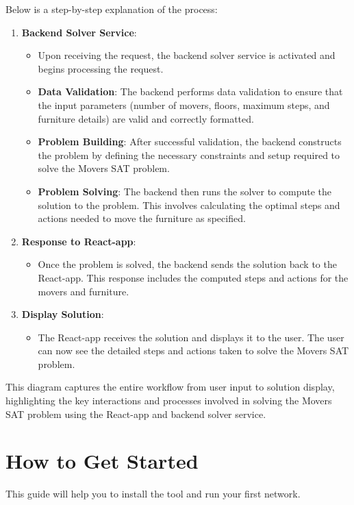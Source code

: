 \documentclass[a4paper, 11pt]{article}
\begin{document}
Below is a step-by-step explanation of the process:

\begin{enumerate}

	\item \textbf{Backend Solver Service}:
	      \begin{itemize}
		      \item Upon receiving the request, the backend solver service is activated and begins processing the request.
		      \item \textbf{Data Validation}: The backend performs data validation to ensure that the input parameters (number of movers, floors, maximum steps, and furniture details) are valid and correctly formatted.
		      \item \textbf{Problem Building}: After successful validation, the backend constructs the problem by defining the necessary constraints and setup required to solve the Movers SAT problem.
		      \item \textbf{Problem Solving}: The backend then runs the solver to compute the solution to the problem. This involves calculating the optimal steps and actions needed to move the furniture as specified.
	      \end{itemize}
	\item \textbf{Response to React-app}:
	      \begin{itemize}
		      \item Once the problem is solved, the backend sends the solution back to the React-app. This response includes the computed steps and actions for the movers and furniture.
	      \end{itemize}
	\item \textbf{Display Solution}:
	      \begin{itemize}
		      \item The React-app receives the solution and displays it to the user. The user can now see the detailed steps and actions taken to solve the Movers SAT problem.
	      \end{itemize}
\end{enumerate}

This diagram captures the entire workflow from user input to solution display, highlighting the key interactions and processes involved in solving the Movers SAT problem using the React-app and backend solver service.
\pagebreak

\section{How to Get Started}
This guide will help you to install the tool and run your first network.
\end{document}
